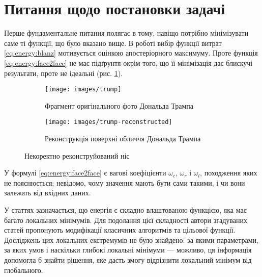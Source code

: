 \section{Питання щодо постановки задачі}

Перше фундаментальне питання полягає в тому,
навіщо потрібно мінімізувати саме ті функції, що було вказано вище.
В роботі \cite{blanz:romdhani:vetter} вибір функції витрат
\eqref{eq:energy:blanz} мотивується оцінкою апостеріорного максимуму.
Проте функція \eqref{eq:energy:face2face} не має підґрунтя окрім того,
що її мінімізація дає блискучі результати, проте не ідеальні
(рис. \ref{fig:questions:trump}).
\begin{figure}[h]
  \centering
  \begin{subfigure}[b]{0.4\textwidth}
    \centering
    \texttt{[image: images/trump]}
    \caption{Фрагмент оригінального фото Дональда Трампа}
  \end{subfigure}
  \begin{subfigure}[b]{0.4\textwidth}
    \centering
    \texttt{[image: images/trump-reconstructed]}
    \caption{Реконструкція поверхні обличчя Дональда Трампа}
  \end{subfigure}
  \caption{Некоректно реконструйований ніс}
  \label{fig:questions:trump}
\end{figure}

У формулі \eqref{eq:energy:face2face} є
вагові коефіцієнти $\omega_c$, $\omega_r$ і $\omega_l$,
походження яких не пояснюється;
невідомо, чому значення мають бути сами такими,
і чи вони залежать від вхідних даних.

У статтях зазначається,
що енергія є складно влаштованою функцією,
яка має багато локальних мінімумів.
Для подолання цієї складності
автори згадуваних статей пропонують
модифікації класичних алгоритмів
та цільової функції.
Досліджень цих локальних екстремумів не було знайдено:
за якими параметрами, за яких умов і наскільки глибокі локальні мінімуми ---
можливо, ця інформація допомогла б знайти рішення,
яке дасть змогу відрізнити локальний мінімум від глобального.
